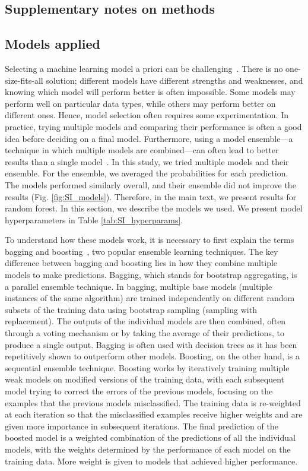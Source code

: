 \documentclass[oneside, a4paper, onecolumn, 11pt]{article}
\begin{document}
\begin{refsection}
\clearpage

\section*{Supplementary notes on methods}

\subsection*{Models applied} \label{sec:SI_models}
Selecting a machine learning model a priori can be challenging~\autocite{Raschka2018-hg}. There is no one-size-fits-all solution; different models have different strengths and weaknesses, and knowing which model will perform better is often impossible. Some models may perform well on particular data types, while others may perform better on different ones. Hence, model selection often requires some experimentation. In practice, trying multiple models and comparing their performance is often a good idea before deciding on a final model. Furthermore, using a model ensemble---a technique in which multiple models are combined---can often lead to better results than a single model~\autocite{Kotsiantis2006-ot}. In this study, we tried multiple models and their ensemble. For the ensemble, we averaged the probabilities for each prediction. The models performed similarly overall, and their ensemble did not improve the results (Fig. \ref{fig:SI_models}). Therefore, in the main text, we present results for random forest. In this section, we describe the models we used. We present model hyperparameters in Table \ref{tab:SI_hyperparams}.

To understand how these models work, it is necessary to first explain the terms bagging and boosting~\autocite{Sagi2018-wa}, two popular ensemble learning techniques. The key difference between bagging and boosting lies in how they combine multiple models to make predictions. Bagging, which stands for bootstrap aggregating, is a parallel ensemble technique. In bagging, multiple base models (multiple instances of the same algorithm) are trained independently on different random subsets of the training data using bootstrap sampling (sampling with replacement). The outputs of the individual models are then combined, often through a voting mechanism or by taking the average of their predictions, to produce a single output. Bagging is often used with decision trees as it has been repetitively shown to outperform other models. Boosting, on the other hand, is a sequential ensemble technique. Boosting works by iteratively training multiple weak models on modified versions of the training data, with each subsequent model trying to correct the errors of the previous models, focusing on the examples that the previous models misclassified. The training data is re-weighted at each iteration so that the misclassified examples receive higher weights and are given more importance in subsequent iterations. The final prediction of the boosted model is a weighted combination of the predictions of all the individual models, with the weights determined by the performance of each model on the training data. More weight is given to models that achieved higher performance.


\end{refsection}
\end{document}
